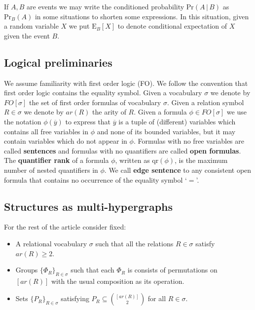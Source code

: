 \documentclass[12pt,notitlepage,a4paper]{article}
\theoremstyle{definition}
\newcommand{\qr}{\mathrm{qr}}
\begin{document}
If $A,B$ are events we may write the conditioned probability $\mathrm{Pr}(A\, | \, B )$ 
as $\mathrm{Pr}_B(A)$ in some situations to shorten some expressions. In this situation, 
given a random variable $X$ we put $\mathrm{E}_B[X]$ to denote conditional expectation of $X$ given the event $B$.  

\subsection{Logical preliminaries}
We assume familiarity with first order logic (FO). We follow 
the convention that first order logic contains the equality symbol. 
Given a vocabulary $\sigma$ we denote by $FO[\sigma]$ the set of 
first order formulas of vocabulary $\sigma$.
Given a relation symbol $R\in \sigma$ we denote by $ar(R)$ the arity of $R$. 
Given a formula $\phi\in FO[\sigma]$ we use the notation $\phi(\overline{y})$ 
to express that $\overline{y}$ is a tuple of 
(different) variables which contains all free variables in $\phi$ and
none of its bounded variables, but it may contain variables
which do not appear in $\phi$.
Formulas with no free variables are called \textbf{sentences} and 
formulas with no quantifiers are called \textbf{open formulas}. The \textbf{quantifier 
rank} of a formula $\phi$, written as $\qr(\phi)$, is the maximum number of 
nested quantifiers in $\phi$.
We call \textbf{edge sentence} to any consistent open formula that contains
no occurrence of the equality symbol `$=$'.




\subsection{Structures as multi-hypergraphs} \label{sect:structures}

For the rest of the article consider fixed:
\begin{itemize}
	\item A relational vocabulary $\sigma$ such 
	that all the relations $R\in\sigma$ satisfy $ar(R)\geq 2$. 
	\item 
	Groups $\{ \Phi_R \}_{R\in \sigma}$
	such that each $\Phi_R$ is consists of 
	permutations on $[ar(R)]$ with the usual 
	composition as its operation.	
	\item 
	Sets $\{P_R\}_{R\in \sigma}$ satisfying
	$P_R\subseteq \binom{[ar(R)]}{2}$ for 
	all $R\in \sigma$.	
	
\end{itemize}
%
\end{document}

